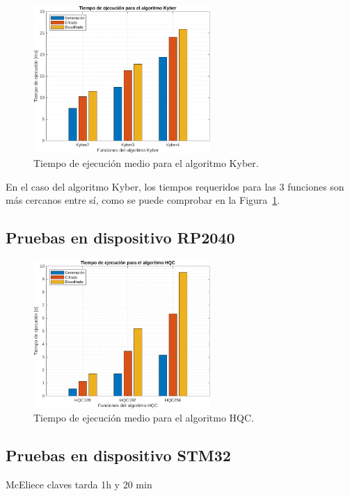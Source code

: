 \begin{figure}[h]
    \centering
    \includegraphics[width=0.6\textwidth]{figures/Kyber.pdf}
    \caption{Tiempo de ejecución medio para el algoritmo Kyber.}
    \label{fig:kyber_res}
\end{figure}

En el caso del algoritmo Kyber, los tiempos requeridos para las 3 funciones son más cercanos entre sí, como se puede comprobar en la Figura~\ref{fig:kyber_res}.


\subsection{Pruebas en dispositivo RP2040}\label{subsec:rp2040_res}


\begin{figure}[h]
    \centering
    \includegraphics[width=0.6\textwidth]{figures/HQC.pdf}
    \caption{Tiempo de ejecución medio para el algoritmo HQC.}
    \label{fig:hqc_res}
\end{figure}


\subsection{Pruebas en dispositivo STM32}\label{subsec:stm32_res}

McEliece claves tarda 1h y 20 min


